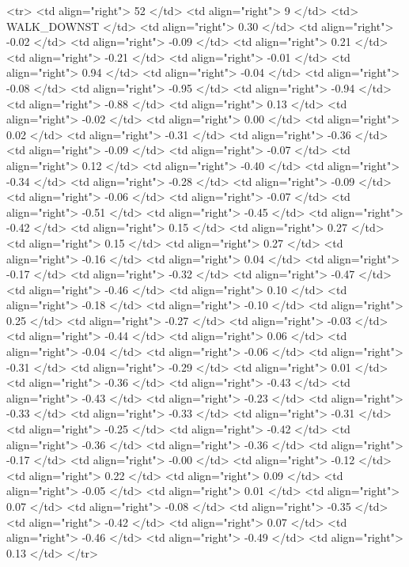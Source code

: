   <tr> <td align="right"> 52 </td> <td align="right">   9 </td> <td> WALK_DOWNST </td> <td align="right"> 0.30 </td> <td align="right"> -0.02 </td> <td align="right"> -0.09 </td> <td align="right"> 0.21 </td> <td align="right"> -0.21 </td> <td align="right"> -0.01 </td> <td align="right"> 0.94 </td> <td align="right"> -0.04 </td> <td align="right"> -0.08 </td> <td align="right"> -0.95 </td> <td align="right"> -0.94 </td> <td align="right"> -0.88 </td> <td align="right"> 0.13 </td> <td align="right"> -0.02 </td> <td align="right"> 0.00 </td> <td align="right"> 0.02 </td> <td align="right"> -0.31 </td> <td align="right"> -0.36 </td> <td align="right"> -0.09 </td> <td align="right"> -0.07 </td> <td align="right"> 0.12 </td> <td align="right"> -0.40 </td> <td align="right"> -0.34 </td> <td align="right"> -0.28 </td> <td align="right"> -0.09 </td> <td align="right"> -0.06 </td> <td align="right"> -0.07 </td> <td align="right"> -0.51 </td> <td align="right"> -0.45 </td> <td align="right"> -0.42 </td> <td align="right"> 0.15 </td> <td align="right"> 0.27 </td> <td align="right"> 0.15 </td> <td align="right"> 0.27 </td> <td align="right"> -0.16 </td> <td align="right"> 0.04 </td> <td align="right"> -0.17 </td> <td align="right"> -0.32 </td> <td align="right"> -0.47 </td> <td align="right"> -0.46 </td> <td align="right"> 0.10 </td> <td align="right"> -0.18 </td> <td align="right"> -0.10 </td> <td align="right"> 0.25 </td> <td align="right"> -0.27 </td> <td align="right"> -0.03 </td> <td align="right"> -0.44 </td> <td align="right"> 0.06 </td> <td align="right"> -0.04 </td> <td align="right"> -0.06 </td> <td align="right"> -0.31 </td> <td align="right"> -0.29 </td> <td align="right"> 0.01 </td> <td align="right"> -0.36 </td> <td align="right"> -0.43 </td> <td align="right"> -0.43 </td> <td align="right"> -0.23 </td> <td align="right"> -0.33 </td> <td align="right"> -0.33 </td> <td align="right"> -0.31 </td> <td align="right"> -0.25 </td> <td align="right"> -0.42 </td> <td align="right"> -0.36 </td> <td align="right"> -0.36 </td> <td align="right"> -0.17 </td> <td align="right"> -0.00 </td> <td align="right"> -0.12 </td> <td align="right"> 0.22 </td> <td align="right"> 0.09 </td> <td align="right"> -0.05 </td> <td align="right"> 0.01 </td> <td align="right"> 0.07 </td> <td align="right"> -0.08 </td> <td align="right"> -0.35 </td> <td align="right"> -0.42 </td> <td align="right"> 0.07 </td> <td align="right"> -0.46 </td> <td align="right"> -0.49 </td> <td align="right"> 0.13 </td> </tr>
